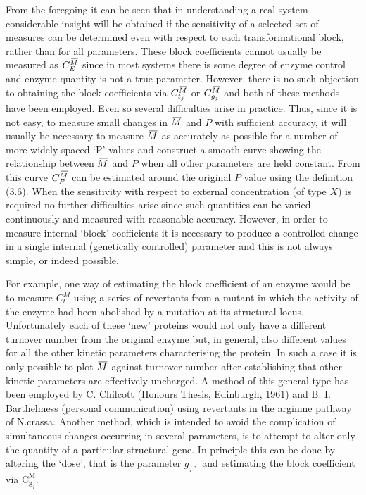 From the foregoing it can be seen that in understanding a real system considerable insight will be obtained if the sensitivity of a selected set of measures can be determined even with respect to each transformational block, rather than for all parameters. These block coefficients cannot usually be measured as $C_{E}^{\,\overline{\!{M}}}$ since in most systems there is some degree of enzyme control and enzyme quantity is not a true parameter. However, there is no such objection to obtaining the block coefficients via $C_{t_j}^{\,\overline{\!{M}}}$ or $C_{g_{j}}^{\,\overline{\!{M}}}$ and both of these methods have been employed. Even so several difficulties arise in practice. Thus, since it is not easy, to measure small changes in $\,\overline{\!{M}}$ and $P$ with sufficient accuracy, it will usually be necessary to measure $\,\overline{\!{M}}$ as accurately as possible for a number of more widely spaced `P' values and construct a smooth curve showing the relationship between $\,\overline{\!{M}}$ and $P$ when all other parameters are held constant. From this curve $C_{P}^{\,\overline{\!{M}}}$ can be estimated around the original $P$ value using the definition (3.6). When the sensitivity with respect to external concentration (of type $X$) is required no further difficulties arise since such quantities can be varied continuously and measured with reasonable accuracy. However, in order to measure internal `block' coefficients it is necessary to produce a controlled change in a single internal (genetically controlled) parameter and this is not always simple, or indeed possible.

For example, one way of estimating the block coefficient of an enzyme would be to measure $C_{t}^{M}$ using a series of revertants from a mutant in which the activity of the enzyme had been abolished by a mutation at its structural locus. Unfortunately each of these `new' proteins would not only have a different turnover number from the original enzyme but, in general, also different values for all the other kinetic parameters characterising the protein. In such a case it is only possible to plot $\,\overline{\!{M}}$ against turnover number after establishing that other kinetic parameters are effectively uncharged. A method of this general type has been employed by C. Chilcott (Honours Thesis, Edinburgh, 1961) and B. I. Barthelmess (personal communication) using revertants in the arginine pathway of N.crassa. Another method, which is intended to avoid the complication of simultaneous changes occurring in several parameters, is to attempt to alter only the quantity of a particular structural gene. In principle this can be done by altering the `dose', that is the parameter $g_{j \text { ' }}$ and estimating the block coefficient via $\mathrm{C}_{\mathrm{g}_{j}}^{\mathrm{M}}$.

